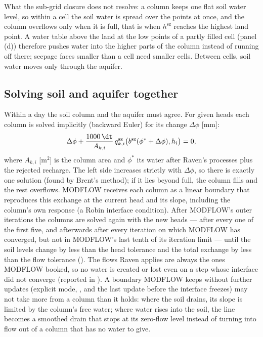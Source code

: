 What the sub-grid closure does not resolve: a column keeps one flat soil water level, so within a cell the soil water is
spread over the points at once, and the column overflows only when it is full, that is when $h^{\mathrm{sz}}$ reaches the highest
land point. A water table above the land at the low points of a partly filled cell (panel (d)) therefore pushes water into the higher parts of the column instead of running off there;
seepage faces smaller than a cell need smaller cells. Between cells, soil water moves only through the aquifer.

\subsection{Solving soil and aquifer together}
Within a day the soil column and the aquifer must agree. For given heads each column is solved implicitly
(backward Euler) for its change $\Delta\phi$ [mm]:
\begin{equation}
\Delta\phi+\frac{1000\,\dt}{A_{k,i}}\,q^{\mathrm{sz}}_{k,i}\big(b^{\mathrm{sz}}(\phi^*+\Delta\phi),h_i\big)=0,
\end{equation}
where $A_{k,i}$ [m$^2$] is the column area and $\phi^*$ its water after Raven's processes plus the rejected recharge. The left side
increases strictly with $\Delta\phi$, so there is exactly one solution (found by Brent's method); if it lies beyond full, the
column fills and the rest overflows. MODFLOW receives each column as a linear boundary that reproduces this exchange at
the current head and its slope, including the column's own response (a Robin interface condition). After MODFLOW's
outer iterations the columns are solved again with the new heads --- after every one of the first five, and afterwards
after every iteration on which MODFLOW has converged, but not in MODFLOW's last tenth of its iteration limit --- until
the soil levels change by less than the head tolerance and the total exchange by less than the flow tolerance
(). The flows Raven applies are always
the ones MODFLOW booked, so no water is created or lost even on a step whose interface did not converge (reported in
). A boundary MODFLOW keeps without further updates (explicit mode, ,
and the last update before the interface freezes) may not take more from a column than it holds: where the soil
drains, its slope is limited by the column's free water; where water rises into the soil, the line becomes a smoothed
drain that stops at its zero-flow level instead of turning into flow out of a column that has no water to give.

